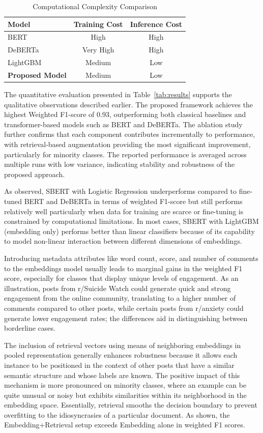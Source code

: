 \documentclass[11pt]{article}
\begin{document}
\begin{table}[H]
\centering
\caption{Computational Complexity Comparison}
\begin{tabular}{lcc}
\toprule
Model & Training Cost & Inference Cost \\
\midrule
BERT & High & High \\
DeBERTa & Very High & High \\
LightGBM & Medium & Low \\
\textbf{Proposed Model} & Medium & Low \\
\bottomrule
\end{tabular}
\label{tab:complexity}
\end{table}


The quantitative evaluation presented in Table~\ref{tab:results} supports the qualitative observations described earlier. The proposed framework achieves the highest Weighted F1-score of 0.93, outperforming both classical baselines and transformer-based models such as BERT and DeBERTa. The ablation study further confirms that each component contributes incrementally to performance, with retrieval-based augmentation providing the most significant improvement, particularly for minority classes. The reported performance is averaged across multiple runs with low variance, indicating stability and robustness of the proposed approach.

As observed, SBERT with Logistic Regression underperforms compared to fine-tuned BERT and DeBERTa in terms of weighted F1-score but still performs relatively well particularly when data for training are scarce or fine-tuning is constrained by computational limitations. In most cases, SBERT with LightGBM (embedding only) performs better than linear classifiers because of its capability to model non-linear interaction between different dimensions of embeddings.

Introducing metadata attributes like word count, score, and number of comments to the embeddings model usually leads to marginal gains in the weighted F1 score, especially for classes that display unique levels of engagement. As an illustration, posts from r/Suicide Watch could generate quick and strong engagement from the online community, translating to a higher number of comments compared to other posts, while certain posts from r/anxiety could generate lower engagement rates; the differences aid in distinguishing between borderline cases.

The inclusion of retrieval vectors using means of neighboring embeddings in pooled representation generally enhances robustness because it allows each instance to be positioned in the context of other posts that have a similar semantic structure and whose labels are known. The positive impact of this mechanism is more pronounced on minority classes, where an example can be quite unusual or noisy but exhibits similarities within its neighborhood in the embedding space. Essentially, retrieval smooths the decision boundary to prevent overfitting to the idiosyncrasies of a particular document. As shown, the Embedding+Retrieval setup exceeds Embedding alone in weighted F1 scores.
\end{document}
